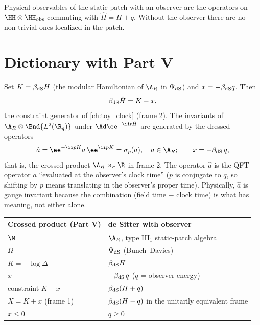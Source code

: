 \begin{keyidea}
Physical observables of the static patch with an observer are the operators on $\HH\otimes\HH_{\rm obs}$ commuting with $\hat H=H+q$. Without the observer there are no non-trivial ones localized in the patch.
\end{keyidea}

\section{Dictionary with Part V}

Set $K=\beta_{\rm dS}H$ (the modular Hamiltonian of $\A_R$ in $\Psi_{\rm dS}$) and $x=-\beta_{\rm dS}q$. Then
\begin{equation}
\beta_{\rm dS}\hat H=K-x,
\end{equation}
the constraint generator of \cref{ch:toy_clock} (frame 2). The invariants of $\A_R\otimes\Bnd{L^2(\R_q)}$ under $\Ad\ee^{-\ii t\hat H}$ are generated by the dressed operators
\begin{equation}
\hat a=\ee^{-\ii pK}a\,\ee^{\ii pK}=\sigma_p(a),\quad a\in\A_R;\qquad x=-\beta_{\rm dS}\,q,
\end{equation}
that is, the crossed product $\A_R\rtimes_\sigma\R$ in frame 2. The operator $\hat a$ is the QFT operator $a$ ``evaluated at the observer's clock time'' ($p$ is conjugate to $q$, so shifting by $p$ means translating in the observer's proper time). Physically, $\hat a$ is gauge invariant because the combination (field time $-$ clock time) is what has meaning, not either alone.

\begin{table}[h]
\centering
\begin{tabular}{@{}ll@{}}
\toprule
Crossed product (Part V) & de Sitter with observer\\
\midrule
$\M$ & $\A_R$, type III$_1$ static-patch algebra\\
$\Omega$ & $\Psi_{\rm dS}$ (Bunch--Davies)\\
$K=-\log\Delta$ & $\beta_{\rm dS}H$\\
$x$ & $-\beta_{\rm dS}\,q$ ($q$ = observer energy)\\
constraint $K-x$ & $\beta_{\rm dS}(H+q)$\\
$X=K+x$ (frame 1) & $\beta_{\rm dS}(H-q)$ in the unitarily equivalent frame\\
$x\le0$ & $q\ge0$\\
\bottomrule
\end{tabular}
\end{table}

